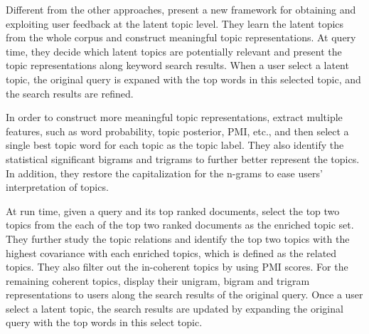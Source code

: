 Different from the other approaches, \cite{Andrzejewski-2011} present a new framework for obtaining and exploiting user feedback at the latent topic level. They learn the latent topics from the whole corpus and construct meaningful topic representations. At query time, they decide which latent topics are potentially relevant and present the topic representations along keyword search results. When a user select a latent topic, the original query is expaned with the top words in this selected topic, and the search results are refined.

In order to construct more meaningful topic representations, \cite{Andrzejewski-2011} extract multiple features, such as word probability, topic posterior, PMI, etc., and then select a single best topic word for each topic as the topic label. They also identify the statistical significant bigrams and trigrams to further better represent the topics. In addition, they restore the capitalization for the n-grams to ease users' interpretation of topics.


At run time, given a query and its top ranked documents, \cite{Andrzejewski-2011} select the top two topics from the each of the top two ranked documents as the enriched topic set. They further study the topic relations and identify the top two topics with the highest covariance with each enriched topics, which is defined as the related topics. They also filter out the in-coherent topics by using PMI scores. For the remaining coherent topics, \cite{Andrzejewski-2011} display their unigram, bigram and trigram representations to users along the search results of the original query. Once a user select a latent topic, the search results are updated by expanding the original query with the top words in this select topic.




